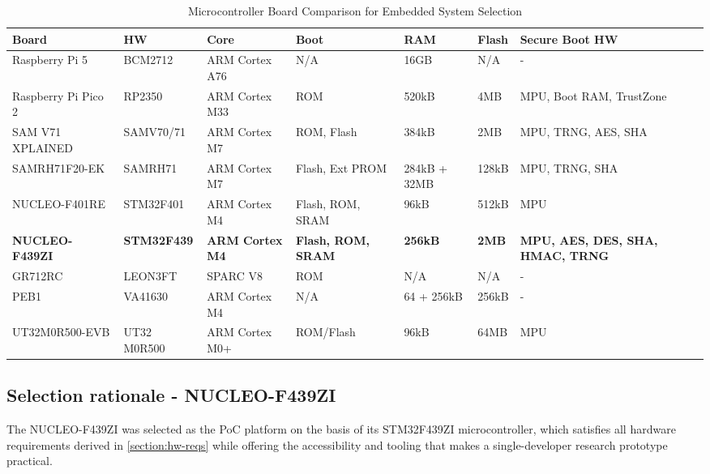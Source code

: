 \begin{table}[htbp]
\centering
\caption{Microcontroller Board Comparison for Embedded System Selection}
\label{tab:mcu_comparison}
\begin{tabularx}{\textwidth}{|p{2.3cm}|X|X|X|X|X|X|X|}
\hline
\textbf{Board} & \textbf{HW} & \textbf{Core} & \textbf{Boot} & \textbf{RAM} & \textbf{Flash} & \textbf{Secure Boot HW} \\
\hline
Raspberry Pi 5 & BCM2712 & ARM Cortex A76 & N/A & 16GB & N/A & - \\
\hline
Raspberry Pi Pico 2 & RP2350 & ARM Cortex M33 & ROM & 520kB & 4MB & MPU, Boot RAM, TrustZone \\
\hline
SAM V71 XPLAINED & SAMV70/71 & ARM Cortex M7 & ROM, Flash & 384kB & 2MB & MPU, TRNG, AES, SHA \\
\hline
SAMRH71F20-EK & SAMRH71 & ARM Cortex M7 & Flash, Ext PROM & 284kB + 32MB & 128kB & MPU, TRNG, SHA \\
\hline
NUCLEO-F401RE & STM32F401 & ARM Cortex M4 & Flash, ROM, SRAM & 96kB & 512kB & MPU \\
\hline
\textbf{NUCLEO-F439ZI} & \textbf{STM32F439} & \textbf{ARM Cortex M4} & \textbf{Flash, ROM, SRAM} & \textbf{256kB} & \textbf{2MB} & \textbf{MPU, AES, DES, SHA, HMAC, TRNG} \\
\hline
GR712RC & LEON3FT & SPARC V8 & ROM & N/A & N/A & - \\
\hline
PEB1 & VA41630 & ARM Cortex M4 & N/A & 64 + 256kB & 256kB & - \\
\hline
UT32M0R500-EVB & UT32 M0R500 & ARM Cortex M0+ & ROM/Flash & 96kB & 64MB & MPU \\
\hline
\end{tabularx}
\end{table}

\subsection{Selection rationale - NUCLEO-F439ZI}
\label{subsection:hw-selection-nucleo}

The NUCLEO-F439ZI was selected as the PoC platform on the basis of its STM32F439ZI microcontroller, which satisfies all hardware requirements derived in \autoref{section:hw-reqs} while offering the accessibility and tooling that makes a single-developer research prototype practical.

